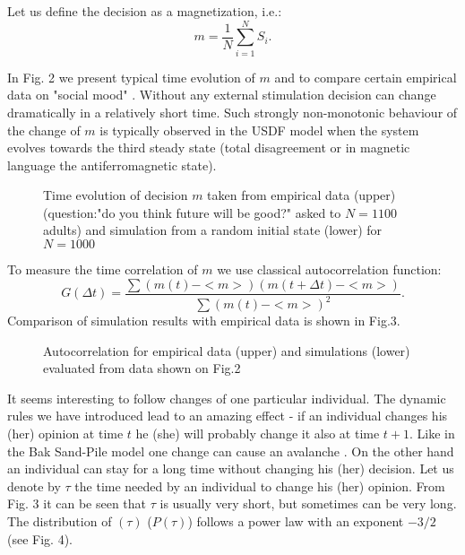Let us define the decision as a magnetization, i.e.:
\begin{equation}
m=\frac{1}{N}\sum_{i=1}^N S_i.
\label{em}
\end{equation}

In Fig. 2 we present typical time evolution of $m$ and to compare
certain empirical data on "social mood" \cite{cbos}. 
Without any external stimulation decision can change
dramatically in a relatively short time. 
Such strongly non-monotonic behaviour of the change of $m$ 
is typically observed in the USDF model when the system evolves 
towards the third steady state (total disagreement or in magnetic 
language the antiferromagnetic state). 

\begin{figure}[htbp]
\centerline{\epsfxsize=12cm }
\caption{Time evolution of decision $m$ taken from empirical data 
(upper) (question:"do you think future will be good?" asked
to $N=1100$ adults) and simulation 
from a random initial state (lower) for $N=1000$}
\end{figure}

To measure the time correlation of $m$ we use classical autocorrelation function:
\begin{equation}
G(\Delta t) = \frac
{\sum \left( m(t)-<m>\right) \left( m(t+ \Delta t)- <m>\right)} 
{\sum (m(t)-<m>)^2}.
\end{equation}
Comparison of simulation results with empirical data is shown in Fig.3.

\begin{figure}[htbp]
\centerline{\epsfxsize=12cm }
\caption{Autocorrelation for empirical data
(upper) and simulations (lower) evaluated from data shown on Fig.2
}
\end{figure}

It seems interesting to follow changes of one particular individual.
The dynamic rules we have introduced lead to an amazing
effect - if an individual changes his (her) opinion at time $t$ he
(she) will probably
change it also at time $t+1$. Like in the Bak Sand-Pile
model one change can cause an avalanche \cite{Bak,BS}. On the other hand
an individual can stay for a long time without changing his (her) decision.
Let us denote by $\tau$ the time needed by an individual to change  his (her)
opinion. From Fig. 3 it can be seen that $\tau$ is usually very short,
but sometimes can be very long. The distribution of $(\tau)$ ($P(\tau)$) 
follows a power law with an exponent $-3/2$ (see Fig. 4).

